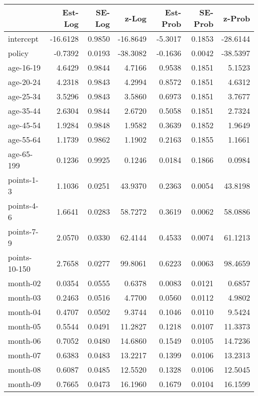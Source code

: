 \documentclass[10pt]{article}
\begin{document}
\begin{table}[ht]
\centering
\begin{tabular}{lrrrrrr}
  \hline
 & Est-Log & SE-Log & z-Log & Est-Prob & SE-Prob & z-Prob \\ 
  \hline
intercept & -16.6128 & 0.9850 & -16.8649 & -5.3017 & 0.1853 & -28.6144 \\ 
  policy & -0.7392 & 0.0193 & -38.3082 & -0.1636 & 0.0042 & -38.5397 \\ 
  age-16-19 & 4.6429 & 0.9844 & 4.7166 & 0.9538 & 0.1851 & 5.1523 \\ 
  age-20-24 & 4.2318 & 0.9843 & 4.2994 & 0.8572 & 0.1851 & 4.6312 \\ 
  age-25-34 & 3.5296 & 0.9843 & 3.5860 & 0.6973 & 0.1851 & 3.7677 \\ 
  age-35-44 & 2.6304 & 0.9844 & 2.6720 & 0.5058 & 0.1851 & 2.7324 \\ 
  age-45-54 & 1.9284 & 0.9848 & 1.9582 & 0.3639 & 0.1852 & 1.9649 \\ 
  age-55-64 & 1.1739 & 0.9862 & 1.1902 & 0.2163 & 0.1855 & 1.1661 \\ 
  age-65-199 & 0.1236 & 0.9925 & 0.1246 & 0.0184 & 0.1866 & 0.0984 \\ 
  points-1-3 & 1.1036 & 0.0251 & 43.9370 & 0.2363 & 0.0054 & 43.8198 \\ 
  points-4-6 & 1.6641 & 0.0283 & 58.7272 & 0.3619 & 0.0062 & 58.0886 \\ 
  points-7-9 & 2.0570 & 0.0330 & 62.4144 & 0.4533 & 0.0074 & 61.1213 \\ 
  points-10-150 & 2.7658 & 0.0277 & 99.8061 & 0.6223 & 0.0063 & 98.4659 \\ 
  month-02 & 0.0354 & 0.0555 & 0.6378 & 0.0083 & 0.0121 & 0.6857 \\ 
  month-03 & 0.2463 & 0.0516 & 4.7700 & 0.0560 & 0.0112 & 4.9802 \\ 
  month-04 & 0.4707 & 0.0502 & 9.3744 & 0.1046 & 0.0110 & 9.5424 \\ 
  month-05 & 0.5544 & 0.0491 & 11.2827 & 0.1218 & 0.0107 & 11.3373 \\ 
  month-06 & 0.7052 & 0.0480 & 14.6860 & 0.1549 & 0.0105 & 14.7236 \\ 
  month-07 & 0.6383 & 0.0483 & 13.2217 & 0.1399 & 0.0106 & 13.2313 \\ 
  month-08 & 0.6087 & 0.0485 & 12.5520 & 0.1328 & 0.0106 & 12.5045 \\ 
  month-09 & 0.7665 & 0.0473 & 16.1960 & 0.1679 & 0.0104 & 16.1599 \\ 

\end{tabular}
\end{table}
\end{document}
